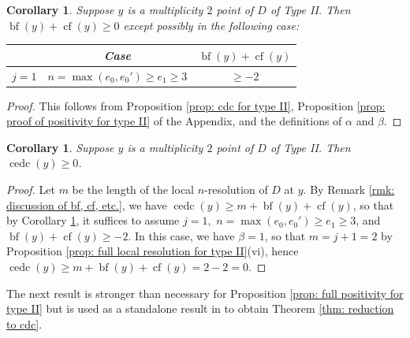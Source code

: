 \documentclass[12pt]{amsart}
\numberwithin{equation}{section}
\newtheorem{corollary}[equation]{Corollary}
\theoremstyle{definition}
\DeclareMathOperator{\blf}{bf}
\DeclareMathOperator{\cf}{cf}
\DeclareMathOperator{\cedc}{cedc}
\begin{document}

\begin{corollary}\label{cor: first positivity for type II}
    Suppose $y$ is a multiplicity $2$ point of $D$ of Type II. Then $\blf(y)+\cf(y)\geq0$ except possibly in the following case:
    \begin{table}[h!]
    \centering
    \renewcommand{\arraystretch}{1.4}
    \begin{tabular}{|cc|c|}
        \hline
        & \textbf{\textup{Case}} & $\blf(y)+\cf(y)$ \\
        \hline
        $j=1$ & $n=\max(e_0,e_0')\geq e_1\geq3$ & $\geq-2$ \\
        \hline
    \end{tabular}
    \end{table}
\end{corollary}
\begin{proof}
    This follows from Proposition \ref{prop: cdc for type II}, Proposition \ref{prop: proof of positivity for type II} of the Appendix, and the definitions of $\alpha$ and $\beta$.
\end{proof}

\begin{corollary}\label{cor: cedc positivity for type II}
    Suppose $y$ is a multiplicity $2$ point of $D$ of Type II. Then $\cedc(y)\geq0$.
\end{corollary}
\begin{proof}
    Let $m$ be the length of the local $n$-resolution of $D$ at $y$. By Remark \ref{rmk: discussion of bf, cf, etc.}, we have $\cedc(y)\geq m+\blf(y)+\cf(y)$, so that by Corollary \ref{cor: first positivity for type II}, it suffices to assume $j=1,$ $n=\max(e_0,e_0')\geq e_1\geq3$, and $\blf(y)+\cf(y)\geq -2$. In this case, we have $\beta=1$, so that $m=j+1=2$ by Proposition \ref{prop: full local resolution for type II}(vi), hence $\cedc(y)\geq m+\blf(y)+\cf(y)= 2-2=0$.
\end{proof}

The next result is stronger than necessary for Proposition \ref{prop: full positivity for type II} but is used as a standalone result in \cite{Part1} to obtain Theorem \ref{thm: reduction to cdc}.
\end{document}
